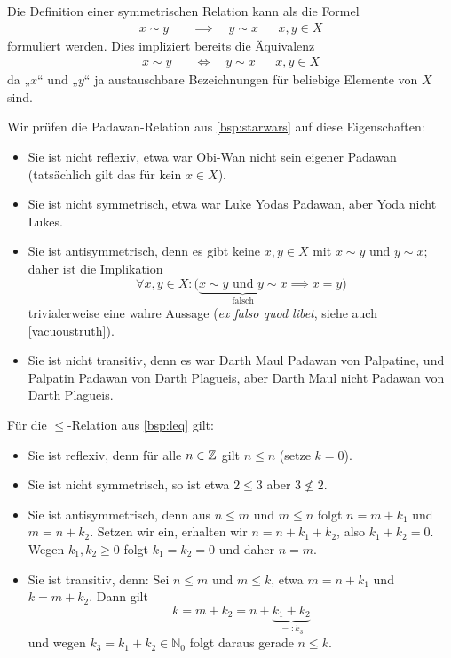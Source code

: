 \begin{bem}
 Die Definition einer symmetrischen Relation kann als die Formel
 \begin{align*}
  x\sim y\quad & \implies\quad y\sim x && x,y\in X
 \end{align*}
formuliert werden. Dies impliziert bereits die Äquivalenz
 \begin{align*}
  x\sim y\quad & \Leftrightarrow\quad y\sim x && x,y\in X
 \end{align*}
 da „$x$“ und „$y$“ ja austauschbare Bezeichnungen für beliebige Elemente von $X$ sind.
\end{bem}


\begin{bsp}\label{bsp:relationseigenschaften}
	Wir prüfen die Padawan-Relation aus \cref{bsp:starwars} auf diese Eigenschaften:
		\begin{itemize}
			\item Sie ist nicht reflexiv, etwa war Obi-Wan nicht sein eigener Padawan (tatsächlich gilt das für kein $x\in X$).
			\item Sie ist nicht symmetrisch, etwa war Luke Yodas Padawan, aber Yoda nicht Lukes.
			\item Sie ist antisymmetrisch, denn es gibt keine $x,y\in X$ mit $x\sim y$ und $y\sim x$; daher ist die Implikation
				\[ \forall x,y\in X : \big(\underbrace{x\sim y \text{ und }y\sim x}_\text{falsch}\implies x=y\big) \]
			trivialerweise eine wahre Aussage (\textit{ex falso quod libet}, siehe auch \cref{vacuoustruth}).
			\item Sie ist nicht transitiv, denn es war Darth Maul Padawan von Palpatine, und Palpatin Padawan von Darth Plagueis, aber Darth Maul nicht Padawan von Darth Plagueis.
		\end{itemize}
	Für die $\leq$-Relation aus \cref{bsp:leq} gilt:
		\begin{itemize}
			\item Sie ist reflexiv, denn für alle $n\in{\mathbb Z}$ gilt $n\leq n$ (setze $k=0$).
			\item Sie ist nicht symmetrisch, so ist etwa $2\leq3$ aber $3\not\leq2$.
			\item Sie ist antisymmetrisch, denn aus $n\leq m$ und $m\leq n$ folgt $n=m+k_1$ und $m=n+k_2$. Setzen wir ein, erhalten wir $n=n+k_1+k_2$, also $k_1+k_2=0$. Wegen $k_1,k_2\geq0$ folgt $k_1=k_2=0$ und daher $n=m$.
			\item Sie ist transitiv, denn: Sei $n\leq m$ und $m\leq k$, etwa $m=n+k_1$ und $k=m+k_2$. Dann gilt
				\[ k=m+k_2=n+\underbrace{k_1+k_2}_{=:k_3} \]
				und wegen $k_3=k_1+k_2\in\mathbb{N}_0$ folgt daraus gerade $n\leq k$.
		\end{itemize}
\end{bsp}



